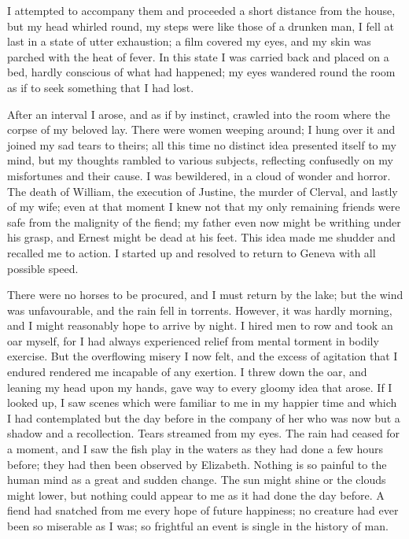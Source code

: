 \documentclass[12pt,openright]{book}
\begin{document}
I attempted to accompany them and proceeded a short distance from the house, but my head whirled round, my steps were like those of a drunken man, I fell at last in a state of utter exhaustion; a film covered my eyes, and my skin was parched with the heat of fever. In this state I was carried back and placed on a bed, hardly conscious of what had happened; my eyes wandered round the room as if to seek something that I had lost.

After an interval I arose, and as if by instinct, crawled into the room where the corpse of my beloved lay. There were women weeping around; I hung over it and joined my sad tears to theirs; all this time no distinct idea presented itself to my mind, but my thoughts rambled to various subjects, reflecting confusedly on my misfortunes and their cause. I was bewildered, in a cloud of wonder and horror. The death of William, the execution of Justine, the murder of Clerval, and lastly of my wife; even at that moment I knew not that my only remaining friends were safe from the malignity of the fiend; my father even now might be writhing under his grasp, and Ernest might be dead at his feet. This idea made me shudder and recalled me to action. I started up and resolved to return to Geneva with all possible speed.

There were no horses to be procured, and I must return by the lake; but the wind was unfavourable, and the rain fell in torrents. However, it was hardly morning, and I might reasonably hope to arrive by night. I hired men to row and took an oar myself, for I had always experienced relief from mental torment in bodily exercise. But the overflowing misery I now felt, and the excess of agitation that I endured rendered me incapable of any exertion. I threw down the oar, and leaning my head upon my hands, gave way to every gloomy idea that arose. If I looked up, I saw scenes which were familiar to me in my happier time and which I had contemplated but the day before in the company of her who was now but a shadow and a recollection. Tears streamed from my eyes. The rain had ceased for a moment, and I saw the fish play in the waters as they had done a few hours before; they had then been observed by Elizabeth. Nothing is so painful to the human mind as a great and sudden change. The sun might shine or the clouds might lower, but nothing could appear to me as it had done the day before. A fiend had snatched from me every hope of future happiness; no creature had ever been so miserable as I was; so frightful an event is single in the history of man.
\end{document}
